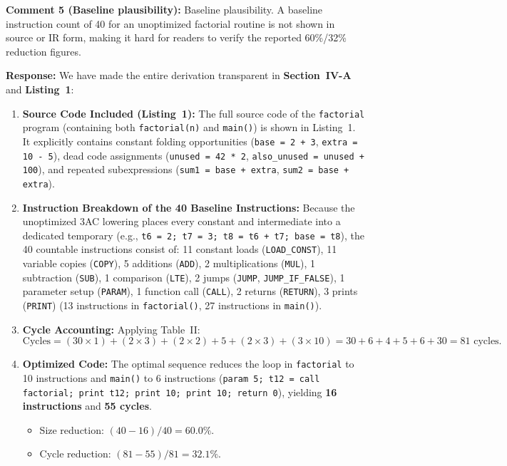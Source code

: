\documentclass[10pt,a4paper]{article}
\begin{document}
\vspace{0.8em}
\begin{reviewercomment}
\textbf{Comment 5 (Baseline plausibility):} Baseline plausibility. A baseline instruction count of 40 for an unoptimized factorial routine is not shown in source or IR form, making it hard for readers to verify the reported 60\%/32\% reduction figures.
\end{reviewercomment}

\noindent \textbf{Response:} We have made the entire derivation transparent in \textbf{Section~IV-A} and \textbf{Listing~1}:
\begin{enumerate}[itemsep=1pt,parsep=0pt,topsep=2pt]
    \item \textbf{Source Code Included (Listing~1):} The full source code of the \texttt{factorial} program (containing both \texttt{factorial(n)} and \texttt{main()}) is shown in Listing~1. It explicitly contains constant folding opportunities (\texttt{base = 2 + 3}, \texttt{extra = 10 - 5}), dead code assignments (\texttt{unused = 42 * 2}, \texttt{also\_unused = unused + 100}), and repeated subexpressions (\texttt{sum1 = base + extra}, \texttt{sum2 = base + extra}).
    \item \textbf{Instruction Breakdown of the 40 Baseline Instructions:} Because the unoptimized 3AC lowering places every constant and intermediate into a dedicated temporary (e.g., \texttt{t6 = 2; t7 = 3; t8 = t6 + t7; base = t8}), the 40 countable instructions consist of: 11 constant loads (\texttt{LOAD\_CONST}), 11 variable copies (\texttt{COPY}), 5 additions (\texttt{ADD}), 2 multiplications (\texttt{MUL}), 1 subtraction (\texttt{SUB}), 1 comparison (\texttt{LTE}), 2 jumps (\texttt{JUMP}, \texttt{JUMP\_IF\_FALSE}), 1 parameter setup (\texttt{PARAM}), 1 function call (\texttt{CALL}), 2 returns (\texttt{RETURN}), 3 prints (\texttt{PRINT}) (13 instructions in \texttt{factorial()}, 27 instructions in \texttt{main()}).
    \item \textbf{Cycle Accounting:} Applying Table~II:
    \[ \text{Cycles} = (30 \times 1) + (2 \times 3) + (2 \times 2) + 5 + (2 \times 3) + (3 \times 10) = 30 + 6 + 4 + 5 + 6 + 30 = 81 \text{ cycles.} \]
    \item \textbf{Optimized Code:} The optimal sequence reduces the loop in \texttt{factorial} to 10 instructions and \texttt{main()} to 6 instructions (\texttt{param 5; t12 = call factorial; print t12; print 10; print 10; return 0}), yielding \textbf{16 instructions} and \textbf{55 cycles}.
    \begin{itemize}[itemsep=1pt,parsep=0pt]
        \item Size reduction: $(40 - 16) / 40 = 60.0\%$.
        \item Cycle reduction: $(81 - 55) / 81 = 32.1\%$.
    \end{itemize}
\end{enumerate}
\end{document}
